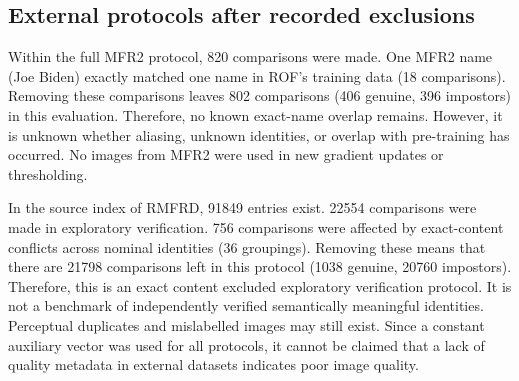 \documentclass[10pt,lettersize,journal]{IEEEtran}
\begin{document}
\subsection{External protocols after recorded exclusions}
Within the full MFR2 protocol, 820 comparisons were made. One MFR2 name (Joe Biden) exactly matched one name in ROF’s training data (18 comparisons). Removing these comparisons leaves 802 comparisons (406 genuine, 396 impostors) in this evaluation. Therefore, no known exact-name overlap remains. However, it is unknown whether aliasing, unknown identities, or overlap with pre-training has occurred. No images from MFR2 were used in new gradient updates or thresholding.\par
In the source index of RMFRD, 91849 entries exist. 22554 comparisons were made in exploratory verification. 756 comparisons were affected by exact-content conflicts across nominal identities (36 groupings). Removing these means that there are 21798 comparisons left in this protocol (1038 genuine, 20760 impostors). Therefore, this is an exact content excluded exploratory verification protocol. It is not a benchmark of independently verified semantically meaningful identities. Perceptual duplicates and mislabelled images may still exist. Since a constant auxiliary vector was used for all protocols, it cannot be claimed that a lack of quality metadata in external datasets indicates poor image quality.\par
\end{document}
